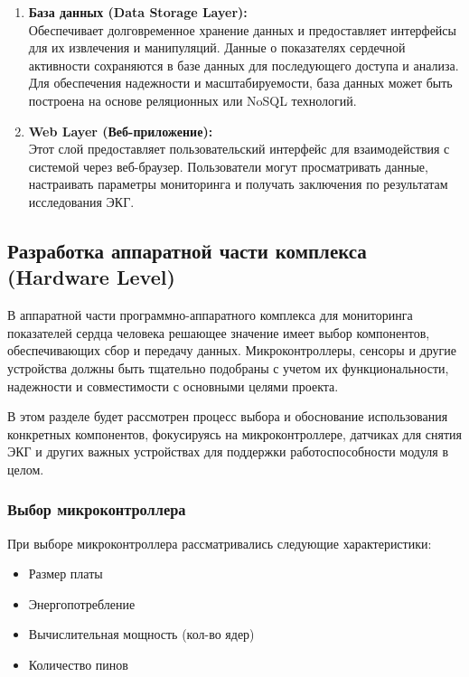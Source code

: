 \documentclass[12pt, russian]{extarticle}
\begin{document}
\begin{spacing}{1.5}
\begin {enumerate}
    \item \textbf{База данных (Data Storage Layer):} \\
        Обеспечивает долговременное хранение данных и предоставляет интерфейсы для их извлечения и манипуляций.
        Данные о показателях сердечной активности сохраняются в базе данных для последующего доступа и анализа.
        Для обеспечения надежности и масштабируемости, база данных может быть построена на основе реляционных или NoSQL технологий.

    \item \textbf{Web Layer (Веб-приложение):} \\
        Этот слой предоставляет пользовательский интерфейс для взаимодействия с системой через веб-браузер. Пользователи могут просматривать данные, настраивать параметры мониторинга и получать заключения по результатам исследования ЭКГ.
\end{enumerate}

\newpage
\subsection{Разработка аппаратной части комплекса (Hardware Level)}

В аппаратной части программно-аппаратного комплекса для мониторинга показателей сердца человека решающее значение имеет выбор компонентов, обеспечивающих сбор и передачу данных. Микроконтроллеры, сенсоры и другие устройства должны быть тщательно подобраны с учетом их функциональности, надежности и совместимости с основными целями проекта. 

В этом разделе будет рассмотрен процесс выбора и обоснование использования конкретных компонентов, фокусируясь на микроконтроллере, датчиках для снятия ЭКГ и других важных устройствах для поддержки работоспособности модуля в целом.

\subsubsection{Выбор микроконтроллера}

При выборе микроконтроллера рассматривались следующие характеристики:

\begin{itemize}
    \item Размер платы
    \item Энергопотребление
    \item Вычислительная мощность (кол-во ядер)
    \item Количество пинов
\end{itemize}


\end{spacing}
\end{document}
